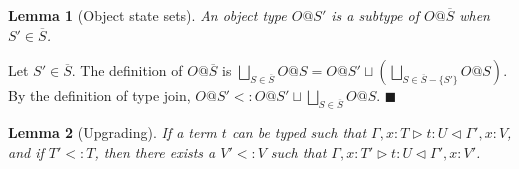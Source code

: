 \documentclass{article}
\newtheorem{lem}{Lemma}
\newcommand{\typerule}[4]{#1 \triangleright #2 : #3 \triangleleft #4}
\newcommand{\qed}{$\blacksquare$}
\newenvironment{proof}{\vspace{1ex}\noindent{\bf Proof}\hspace{0.5em}}
  {\hfill\qed\vspace{1ex}}
\begin{document}
\begin{lem}[Object state sets]
An object type $O@S'$ is a subtype of $O@\overline{S}$ when $S' \in \overline{S}$.
\end{lem}
\begin{proof}
Let $S' \in \overline{S}$. The definition of $O@\overline{S}$ is
$\bigsqcup_{S \in \overline{S}}{O@S} = O@S' \sqcup \left( 
\bigsqcup_{S \in \overline{S} - \{ S' \}}{O@S} \right)$. 
By the definition of type join, $O@S' <: O@S' \sqcup \bigsqcup_{S \in \overline{S}}{O@S}$.
\end{proof}

\begin{lem}[Upgrading]
If a term $t$ can be typed such that 
$\typerule{\Gamma, x : T}{t}{U}{\Gamma', x : V}$, and if
$T' <: T$, then there exists a $V' <: V$ such that
$\typerule{\Gamma, x : T'}{t}{U}{\Gamma', x : V'}$.
\end{lem}
\end{document}
